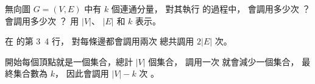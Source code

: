 \startEXERCISE
無向圖 $G=(V,E)$ 中有 $k$ 個連通分量，
對其執行  的過程中，
會調用多少次 ？
會調用多少次 ？
用 $|V|$、 $|E|$ 和 $k$ 表示。
\stopEXERCISE

\startANSWER
在  的第 3~4 行，
對每條邊都會調用兩次 
總共調用 $2|E|$ 次。

開始每個頂點就是一個集合，總計 $|V|$ 個集合，
調用一次  就會減少一個集合，
最終集合數為 $k$，
因此會調用 $|V|-k$ 次 。
\stopANSWER
